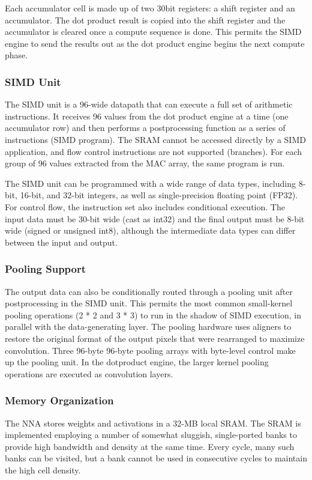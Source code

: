 \documentclass[letterpaper, 10 pt, conference]{ieeeconf}  %
\begin{document}
Each accumulator cell is made up of two 30bit registers: a shift register and an accumulator. The dot product result is copied into the shift register and the accumulator is cleared once a compute sequence is done. This permits the SIMD engine to send the results out as the dot product engine begins the next compute phase.

\subsubsection{SIMD Unit}
The SIMD unit is a 96-wide datapath that can execute a full set of arithmetic instructions. It receives 96 values from the dot product engine at a time (one accumulator row) and then performs a postprocessing function as a series of instructions (SIMD program). The SRAM cannot be accessed directly by a SIMD application, and flow control instructions are not supported (branches). For each group of 96 values extracted from the MAC array, the same program is run.

The SIMD unit can be programmed with a wide range of data types, including 8-bit, 16-bit, and 32-bit integers, as well as single-precision floating point (FP32). For control flow, the instruction set also includes conditional execution. The input data must be 30-bit wide (cast as int32) and the final output must be 8-bit wide (signed or unsigned int8), although the intermediate data types can differ between the input and output.

\subsubsection{Pooling Support}
The output data can also be conditionally routed through a pooling unit after postprocessing in the SIMD unit. This permits the most common small-kernel pooling operations (2 * 2 and 3 * 3) to run in the shadow of SIMD execution, in parallel with the data-generating layer. The pooling hardware uses aligners to restore the original format of the output pixels that were rearranged to maximize convolution. Three 96-byte 96-byte pooling arrays with byte-level control make up the pooling unit. In the dotproduct engine, the larger kernel pooling operations are executed as convolution layers.

\subsubsection{Memory Organization}

The NNA stores weights and activations in a 32-MB local SRAM. The SRAM is implemented employing a number of somewhat sluggish, single-ported banks to provide high bandwidth and density at the same time. Every cycle, many such banks can be visited, but a bank cannot be used in consecutive cycles to maintain the high cell density.
\end{document}
